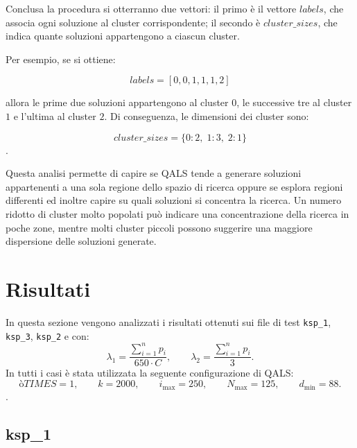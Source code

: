\documentclass[a4paper,12pt]{article}
\begin{document}
Conclusa la procedura si otterranno due vettori: il primo è il vettore $labels$, che associa ogni soluzione al cluster corrispondente; il secondo è $cluster\_sizes$, che indica quante soluzioni appartengono a ciascun cluster.

Per esempio, se si ottiene:

\[
labels = [0,0,1,1,1,2]
\]

allora le prime due soluzioni appartengono al cluster $0$, le successive tre al cluster $1$ e l'ultima al cluster $2$. Di conseguenza, le dimensioni dei cluster sono:

\[
cluster\_sizes = \{0:2,\; 1:3,\; 2:1\}
\].

Questa analisi permette di capire se QALS tende a generare soluzioni appartenenti a una sola regione dello spazio di ricerca oppure se esplora regioni differenti 
ed inoltre capire su quali soluzioni si concentra la ricerca.
Un numero ridotto di cluster molto popolati può indicare una concentrazione della ricerca in poche zone, mentre molti cluster piccoli possono suggerire una 
maggiore dispersione delle soluzioni generate.

\section{Risultati}    

In questa sezione vengono analizzati i risultati ottenuti sui file di test
\texttt{ksp\_1}, \texttt{ksp\_3}, \texttt{ksp\_2} e con:
\[
\lambda_1 = \frac{\sum_{i=1}^{n} p_i}{650 \cdot C}, 
\qquad
\lambda_2 = \frac{\sum_{i=1}^{n} p_i}{3}.
\]
In tutti i casi è stata utilizzata la seguente
configurazione di QALS:
\[ò
TIMES = 1, \qquad
k = 2000, \qquad
i_{\max} = 250, \qquad
N_{\max} = 125, \qquad
d_{\min} = 88.
\].

\clearpage
\subsection{ksp\_1}
\end{document}
